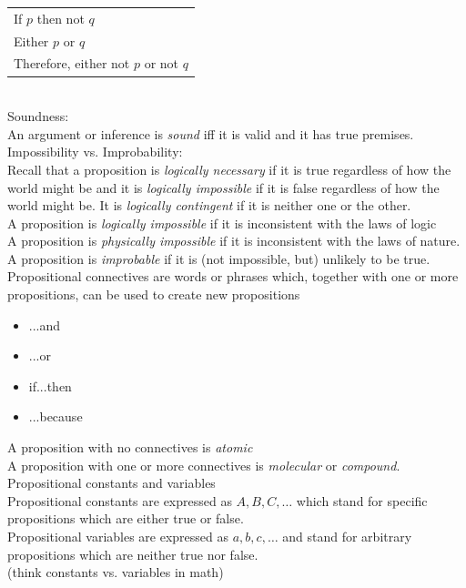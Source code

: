 \documentclass[11pt, fleqn]{article}
\begin{document}
\begin{tabular}{p{3cm}}
    If $p$ then not $q$\\
    Either $p$ or $q$\\
    \hline
    Therefore, either not $p$ or not $q$
\end{tabular}\\

Soundness:\\
An argument or inference is \textit{sound} iff it is valid and it has true premises.\\

Impossibility vs. Improbability:\\
Recall that a proposition is \textit{logically necessary} if it is true regardless of how the world might be and it is \textit{logically impossible} if it is false regardless of how the world might be. It is \textit{logically contingent} if it is neither one or the other.\\

A proposition is \textit{logically impossible} if it is inconsistent with the laws of logic\\
A proposition is \textit{physically impossible} if it is inconsistent with the laws of nature.\\
A proposition is \textit{improbable} if it is (not impossible, but) unlikely to be true.\\

Propositional connectives are words or phrases which, together with one or more propositions, can be used to create new propositions
\begin{itemize}
    \item ...and
    \item ...or
    \item if...then
    \item ...because
\end{itemize}
A proposition with no connectives is \textit{atomic}\\
A proposition with one or more connectives is \textit{molecular} or \textit{compound}.\\

Propositional constants and variables\\
Propositional constants are expressed as $A,B,C,\ldots$ which stand for specific propositions which are either true or false.\\
Propositional variables are expressed as $a,b,c,\ldots$ and stand for arbitrary propositions which are neither true nor false.\\
(think constants vs. variables in math)\\
\end{document}
